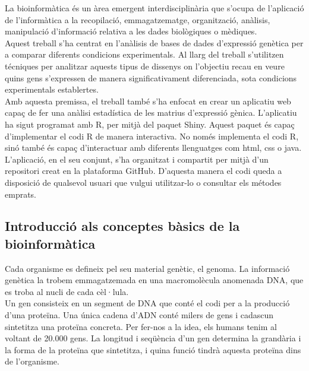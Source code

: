 \documentclass[english]{article}
\begin{document}
La bioinformàtica és un àrea emergent interdisciplinària que s'ocupa de l'aplicació de l'informàtica a la recopilació, emmagatzematge, organització, anàlisis, manipulació d'informació relativa a les dades biològiques o mèdiques.
\\

Aquest treball s'ha centrat en l'anàlisis de bases de dades d'expressió genètica per a comparar diferents condicions experimentals. Al llarg del treball s'utilitzen técniques per analitzar aquests tipus de dissenys on l'objectiu recau en veure quins gens s'expressen de manera significativament diferenciada, sota condicions experimentals establertes.
\\

Amb aquesta premissa, el treball també s'ha enfocat en crear un aplicatiu web capaç de fer una anàlisi estadística de les matrius d'expressió gènica. L'aplicatiu ha sigut programat amb R, per mitjà del paquet Shiny. Aquest paquet és capa\c{c} d'implementar el codi R de manera interactiva. No només implementa el codi R, sinó també és capaç d'interactuar amb diferents llenguatges com html, css o java. L'aplicació, en el seu conjunt, s'ha organitzat i compartit per mitjà d'un repositori creat en la plataforma GitHub. D'aquesta manera el codi queda a disposició de qualsevol usuari que vulgui utilitzar-lo o consultar els métodes emprats.

\subsection{Introducció als conceptes bàsics de la bioinformàtica}
\label{1.1}

Cada organisme es defineix pel seu material genètic, el genoma. La informació genètica la trobem emmagatzemada en una macromolècula anomenada DNA, que es troba al nucli de cada cèl·lula.
\\

Un gen consisteix en un segment de DNA que conté el codi per a la producció d'una proteïna. Una única cadena d'ADN conté milers de gens i cadascun sintetitza una proteïna concreta. Per fer-nos a la idea, els humans tenim al voltant de 20.000 gens. La longitud i seqüència d'un gen determina la grandària i la forma de la proteïna que sintetitza, i quina funció tindrà aquesta proteïna dins de l'organisme.
\\
\end{document}
